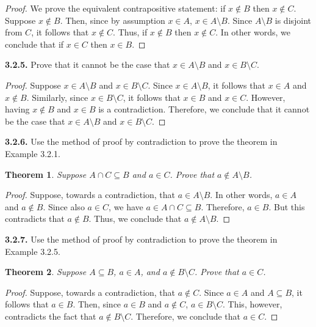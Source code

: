 \documentclass[12pt]{amsart}
\newenvironment{statement}[1]{\smallskip\noindent\color[rgb]{.6627, .3529, .6314} {\bf #1.}}{}
\newtheorem{theorem}{Theorem}
\theoremstyle{definition}
\theoremstyle{remark}
\begin{document}
\begin{proof}
We prove the equivalent contrapositive statement: if $x \notin B$ then $x \notin C$.
Suppose $x \notin B$.
Then, since by assumption $x \in A$, $x \in A \setminus B$.
Since $A \setminus B$ is disjoint from $C$, it follows that $x \notin C$.
Thus, if $x \notin B$ then $x \notin C$.
In other words, we conclude that if $x \in C$ then $x \in B$.
\end{proof}


\begin{statement}{3.2.5}
Prove that it cannot be the case that $x \in A \setminus B$ and $x \in B \setminus C$.
\end{statement}

\begin{proof}
Suppose $x \in A \setminus B$ and $x \in B \setminus C$.
Since $x \in A \setminus B$, it follows that $x \in A$ and $x \notin B$.
Similarly, since $x \in B \setminus C$, it follows that $x \in B$ and $x \in C$.
However, having $x \notin B$ and $x \in B$ is a contradiction.
Therefore, we conclude that it cannot be the case that
$x \in A \setminus B$ and $x \in B \setminus C$.
\end{proof}


\begin{statement}{3.2.6}
Use the method of proof by contradiction to prove the theorem in Example 3.2.1.
\begin{theorem}
	Suppose $A \cap C \subseteq B$ and $a \in C$.
	Prove that $a \notin A \setminus B$.
\end{theorem}
\end{statement}

\begin{proof}
Suppose, towards a contradiction, that $a \in A \setminus B$.
In other words, $a \in A$ and $a \notin B$.
Since also $a \in C$, we have $a \in A \cap C \subseteq B$.
Therefore, $a \in B$.
But this contradicts that $a \notin B$.
Thus, we conclude that $a \notin A \setminus B$.
\end{proof}


\begin{statement}{3.2.7}
Use the method of proof by contradiction to prove the theorem in Example 3.2.5.
\begin{theorem}
	Suppose $A \subseteq B$, $a  \in A$, and $a \notin B \setminus C$.
	Prove that $a \in C$.
\end{theorem}
\end{statement}

\begin{proof}
Suppose, towards a contradiction, that $a \notin C$.
Since $a \in A$ and $A \subseteq B$, it follows that $a \in B$.
Then, since $a \in B$ and $a \notin C$, $a \in B \setminus C$.
This, however, contradicts the fact that $a \notin B \setminus C$.
Therefore, we conclude that $a \in C$.
\end{proof}
\end{document}
